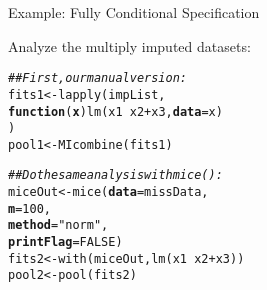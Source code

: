 \documentclass[10pt]{beamer}\usepackage[]{graphicx}\usepackage[]{color}
\makeatletter
\newcommand{\hlnum}[1]{\textcolor[rgb]{0.69,0.494,0}{#1}}%
\newcommand{\hlstr}[1]{\textcolor[rgb]{0.749,0.012,0.012}{#1}}%
\newcommand{\hlcom}[1]{\textcolor[rgb]{0.514,0.506,0.514}{\textit{#1}}}%
\newcommand{\hlopt}[1]{\textcolor[rgb]{0,0,0}{#1}}%
\newcommand{\hlstd}[1]{\textcolor[rgb]{0,0,0}{#1}}%
\newcommand{\hlkwa}[1]{\textcolor[rgb]{0,0,0}{\textbf{#1}}}%
\newcommand{\hlkwb}[1]{\textcolor[rgb]{0,0.341,0.682}{#1}}%
\newcommand{\hlkwc}[1]{\textcolor[rgb]{0,0,0}{\textbf{#1}}}%
\newcommand{\hlkwd}[1]{\textcolor[rgb]{0.004,0.004,0.506}{#1}}%
\newenvironment{kframe}{%
 \def\at@end@of@kframe{}%
 \ifinner\ifhmode%
  \def\at@end@of@kframe{\end{minipage}}%
  \begin{minipage}{\columnwidth}%
 \fi\fi%
 \def\FrameCommand##1{\hskip\@totalleftmargin \hskip-\fboxsep
 \colorbox{shadecolor}{##1}\hskip-\fboxsep
     \hskip-\linewidth \hskip-\@totalleftmargin \hskip\columnwidth}%
 \MakeFramed {\advance\hsize-\width
   \@totalleftmargin\z@ \linewidth\hsize
   \@setminipage}}%
 {\par\unskip\endMakeFramed%
 \at@end@of@kframe}
\newenvironment{knitrout}{}{} %
\makeatother
\begin{document}
\begin{frame}[fragile]{Example: Fully Conditional Specification}
  
  Analyze the multiply imputed datasets:

\begin{knitrout}\footnotesize
{}\color{fgcolor}\begin{kframe}
\begin{alltt}
\hlcom{## First, our manual version:}
\hlstd{fits1} \hlkwb{<-} \hlkwd{lapply}\hlstd{(impList,}
                \hlkwa{function}\hlstd{(}\hlkwc{x}\hlstd{)} \hlkwd{lm}\hlstd{(x1} \hlopt{~} \hlstd{x2} \hlopt{+} \hlstd{x3,} \hlkwc{data} \hlstd{= x)}
                \hlstd{)}
\hlstd{pool1} \hlkwb{<-} \hlkwd{MIcombine}\hlstd{(fits1)}
\end{alltt}


{\ttfamily\noindent\bfseries\color{errorcolor}{Error in variances[[1]]: subscript out of bounds}}\begin{alltt}
\hlcom{## Do the same analysis with mice():}
\hlstd{miceOut} \hlkwb{<-} \hlkwd{mice}\hlstd{(}\hlkwc{data}      \hlstd{= missData,}
                \hlkwc{m}         \hlstd{=} \hlnum{100}\hlstd{,}
                \hlkwc{method}    \hlstd{=} \hlstr{"norm"}\hlstd{,}
                \hlkwc{printFlag} \hlstd{=} \hlnum{FALSE}\hlstd{)}
\hlstd{fits2} \hlkwb{<-} \hlkwd{with}\hlstd{(miceOut,} \hlkwd{lm}\hlstd{(x1} \hlopt{~} \hlstd{x2} \hlopt{+} \hlstd{x3))}
\hlstd{pool2} \hlkwb{<-} \hlkwd{pool}\hlstd{(fits2)}
\end{alltt}
\end{kframe}
\end{knitrout}

\end{frame}

\watermarkon %
\end{document}
